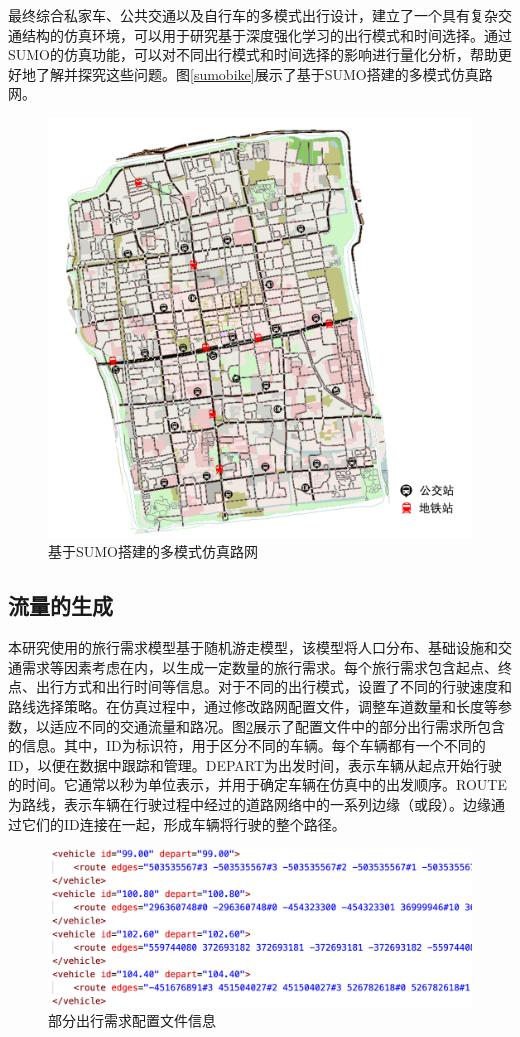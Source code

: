 最终综合私家车、公共交通以及自行车的多模式出行设计，建立了一个具有复杂交通结构的仿真环境，可以用于研究基于深度强化学习的出行模式和时间选择。通过SUMO的仿真功能，可以对不同出行模式和时间选择的影响进行量化分析，帮助更好地了解并探究这些问题。图\ref{sumobike}展示了基于SUMO搭建的多模式仿真路网。

\begin{figure}[H]
  \centering
  \includegraphics[width=.65\linewidth]{figures/content/multimodal.png}
  \caption{基于SUMO搭建的多模式仿真路网}
  \label{multimodal}
\end{figure}


\subsection{流量的生成}

本研究使用的旅行需求模型基于随机游走模型，该模型将人口分布、基础设施和交通需求等因素考虑在内，以生成一定数量的旅行需求。每个旅行需求包含起点、终点、出行方式和出行时间等信息。对于不同的出行模式，设置了不同的行驶速度和路线选择策略。在仿真过程中，通过修改路网配置文件，调整车道数量和长度等参数，以适应不同的交通流量和路况。图\ref{demand}展示了配置文件中的部分出行需求所包含的信息。其中，ID为标识符，用于区分不同的车辆。每个车辆都有一个不同的ID，以便在数据中跟踪和管理。DEPART为出发时间，表示车辆从起点开始行驶的时间。它通常以秒为单位表示，并用于确定车辆在仿真中的出发顺序。ROUTE为路线，表示车辆在行驶过程中经过的道路网络中的一系列边缘（或段）。边缘通过它们的ID连接在一起，形成车辆将行驶的整个路径。
\begin{figure}[H]
  \centering
  \includegraphics[width=.75\linewidth]{figures/content/demand.png}
  \caption{部分出行需求配置文件信息}
  \label{demand}
\end{figure}


